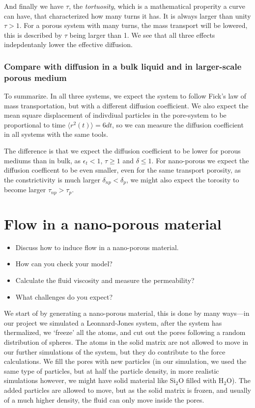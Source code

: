 \documentclass[a4paper, 11pt, notitlepage, english]{article}
\newcommand{\eps}{\epsilon}
\begin{document}
And finally we have $\tau$, the \emph{tortuosity}, which is a mathematical properity a curve can have, that characterized how many turns it has. It is always larger than unity $\tau > 1$. For a porous system with many turns, the mass transport will be lowered, this is described by $\tau$ being larger than 1. We see that all three effects indepdentanly lower the effective diffusion.

\subsubsection*{Compare with diffusion in a bulk liquid and in larger-scale porous medium}

To summarize. In all three systems, we expect the system to follow Fick's law of mass transportation, but with a different diffusion coefficient. We also expect the mean square displacement of indivdiual particles in the pore-system to be proportional to time $\langle r^2 (t) \rangle = 6dt$, so we can measure the diffusion coefficient in all systems with the same tools.

The difference is that we expect the diffusion coefficient to be lower for porous mediums than in bulk, as $\eps_t < 1$, $\tau \geq 1$ and $\delta \leq 1$. For nano-porous we expect the diffusion coefficent to be even smaller, even for the same transport porosity, as the constrictivity is much larger $\delta_{np} < \delta_{p}$, we might also expect the torosity to become larger $\tau_{np} > \tau_{p}$.


\clearpage


\section{Flow in a nano-porous material}
\begin{itemize}
	\item Discuss how to induce flow in a nano-porous material. 
	\item How can you check your model?
	\item Calculate the fluid viscosity and measure the permeability?
	\item What challenges do you expect?
\end{itemize}

We start of by generating a nano-porous material, this is done by many ways---in our project we simulated a Leonnard-Jones system, after the system has thermalized, we `freeze' all the atoms, and cut out the pores following a random distribution of spheres. The atoms in the solid matrix are not allowed to move in our further simulations of the system, but they do contribute to the force calculations. We fill the pores with new particles (in our simulation, we used the same type of particles, but at half the particle density, in more realistic simulations however, we might have solid material like Si$_2$O filled with H$_2$O). The added particles are allowed to move, but as the solid matrix is frozen, and usually of a much higher density, the fluid can only move inside the pores.
\end{document}
